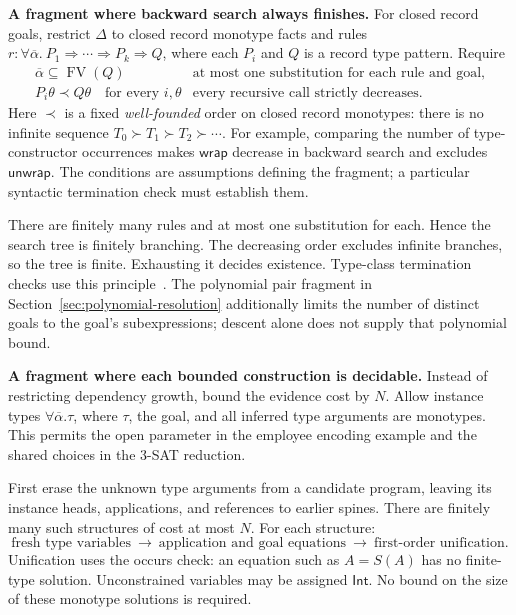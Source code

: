 \documentclass[10pt,a4paper]{article}
\newcommand{\Int}{\mathsf{Int}}
\newcommand{\kw}[1]{\mathsf{#1}}
\begin{document}
\textbf{A fragment where backward search always finishes.}
For closed record goals, restrict $\Delta$ to closed record monotype facts and rules
$r:\forall\overline\alpha.\ P_1\Rightarrow\cdots\Rightarrow P_k\Rightarrow Q$,
where each $P_i$ and $Q$ is a record type pattern. Require
\[
\begin{array}{ll}
 \overline\alpha\subseteq\operatorname{FV}(Q)
   & \text{at most one substitution for each rule and goal},\\[2pt]
 P_i\theta\prec Q\theta\quad\text{for every }i,\theta
   & \text{every recursive call strictly decreases}.
\end{array}
\]
Here $\prec$ is a fixed \emph{well-founded} order on closed record monotypes:
there is no infinite sequence $T_0\succ T_1\succ T_2\succ\cdots$.
For example, comparing the number of type-constructor occurrences makes
$\kw{wrap}$ decrease in backward search and excludes $\kw{unwrap}$.
The conditions are assumptions defining the fragment; a particular syntactic
termination check must establish them.

There are finitely many rules and at most one substitution for each. Hence the
search tree is finitely branching. The decreasing order excludes infinite branches,
so the tree is finite. Exhausting it decides existence.
Type-class termination checks use this principle~\cite{ghc-termination}.
The polynomial pair fragment in Section~\ref{sec:polynomial-resolution} additionally
limits the number of distinct goals to the goal's subexpressions; descent alone
does not supply that polynomial bound.

\newpage
\textbf{A fragment where each bounded construction is decidable.}
Instead of restricting dependency growth, bound the evidence cost by $N$.
Allow instance types $\forall\overline\alpha.\tau$, where $\tau$, the goal,
and all inferred type arguments are monotypes. This permits the open parameter
in the employee encoding example and the shared choices in the 3-SAT reduction.

First erase the unknown type arguments from a candidate program, leaving its
instance heads, applications, and references to earlier spines. There are finitely
many such structures of cost at most $N$. For each structure:
\[
 \boxed{\text{fresh type variables}}
 \ \longrightarrow\
 \boxed{\text{application and goal equations}}
 \ \longrightarrow\
 \boxed{\text{first-order unification}}.
\]
Unification uses the occurs check: an equation such as $A=S(A)$ has no finite-type
solution. Unconstrained variables may be assigned $\Int$.
No bound on the size of these monotype solutions is required.
\end{document}
